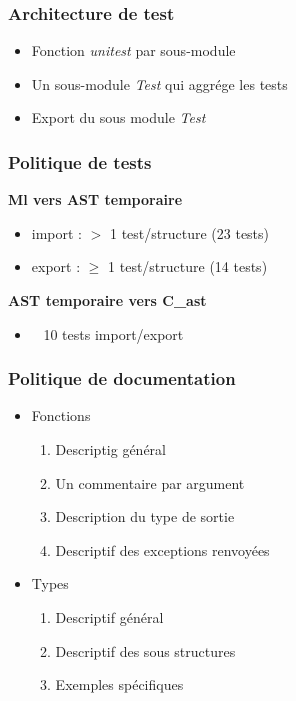 \documentclass{beamer}
\begin{document}
\begin{frame}
    \frametitle{Architecture de test}

    \begin{itemize}
        \item Fonction \textit{unitest} par sous-module
        \item Un sous-module \textit{Test} qui aggrége les tests
        \item Export du sous module \textit{Test}
    \end{itemize}
\end{frame}

\begin{frame}
    \frametitle{Politique de tests}

    \textbf{Ml vers AST temporaire}
    \begin{itemize}
        \item import : $>$ 1 test/structure (23 tests)
        \item export : $\ge$ 1 test/structure (14 tests)
    \end{itemize}

    \textbf{AST temporaire vers C\_ast}
    \begin{itemize}
        \item ~ 10 tests import/export
    \end{itemize}
\end{frame}

\begin{frame}
    \frametitle{Politique de documentation}

    \begin{itemize}
        \item Fonctions
            \begin{enumerate}
                \item Descriptig général
                \item Un commentaire par argument
                \item Description du type de sortie
                \item Descriptif des exceptions renvoyées
            \end{enumerate}
        \item Types
            \begin{enumerate}
                \item Descriptif général
                \item Descriptif des sous structures
                \item Exemples spécifiques
            \end{enumerate}
    \end{itemize}
\end{frame}
\end{document}
